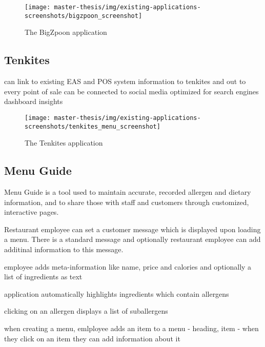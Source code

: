   \begin{figure}[h]
    \centering
    \texttt{[image: master-thesis/img/existing-applications-screenshots/bigzpoon\_screenshot]}
    \caption{The BigZpoon application}
  \end{figure}

\newpage

\subsection*{Tenkites}
  can link to existing EAS and POS system
  information to tenkites and out to every point of sale
  can be connected to social media
  optimized for search engines
  dashboard insights

  \begin{figure}[h]
    \centering
    \texttt{[image: master-thesis/img/existing-applications-screenshots/tenkites\_menu\_screenshot]}
    \caption{The Tenkites application}
  \end{figure}

\subsection*{Menu Guide}
  Menu Guide is a tool used to maintain accurate, recorded allergen and dietary information, and to share those with staff and customers through customized, interactive pages.

  Restaurant employee can set a customer message which is displayed upon loading a menu.
  There is a standard message and optionally restaurant employee can add additinal information to this message.

  employee adds meta-information like name, price and calories and optionally a list of ingredients as text

  application automatically highlights ingredients which contain allergens

  clicking on an allergen displays a list of suballergens

  when creating a menu, emlployee adds an item to a menu - heading, item - when they click on an item they can add information about it


